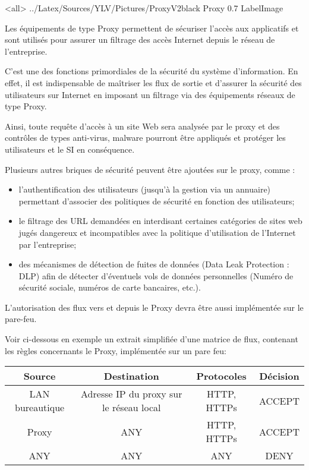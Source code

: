\mode<all>{\picframe
{../Latex/Sources/YLV/Pictures/ProxyV2black}%
{Proxy} %
{0.7} %
{LabelImage} %
}

Les équipements de type Proxy permettent de sécuriser l'accès aux applicatifs et sont utilisés pour assurer un filtrage des accès Internet depuis le réseau de l'entreprise.

C'est une des fonctions primordiales de la sécurité du système d'information.
En effet, il est indispensable de maîtriser les flux de sortie et d'assurer la sécurité des utilisateurs sur Internet en imposant un filtrage via des équipements réseaux de type Proxy. 

Ainsi, toute requête d'accès à un site Web sera analysée par le proxy et des contrôles de types anti-virus, malware pourront être appliqués et protéger les utilisateurs et le SI en conséquence.

Plusieurs autres briques de sécurité peuvent être ajoutées sur le proxy, comme :
\begin{itemize}
    \item l'authentification des utilisateurs (jusqu'à la gestion via un annuaire) permettant d'associer des politiques de sécurité en fonction des utilisateurs;
    \item le filtrage des URL demandées en interdisant certaines catégories de sites web jugés dangereux et incompatibles avec la politique d'utilisation de l'Internet par l'entreprise;
    \item des mécanismes de détection de fuites de données (Data Leak Protection : DLP) afin de détecter d'éventuels vols de données personnelles (Numéro de sécurité sociale, numéros de carte bancaires, etc.).
\end{itemize}

L'autorisation des flux vers et depuis le Proxy devra être aussi implémentée sur le pare-feu.

Voir ci-dessous en exemple un extrait simplifiée d'une matrice de flux, contenant les règles concernants le Proxy, implémentée sur un pare feu:

\begin{center}
\begin{tabular}{||c c c c||} 
 \hline
 Source & Destination & Protocoles & Décision \\ [0.5ex] 
 \hline\hline
 LAN bureautique & Adresse IP du proxy sur le réseau local & HTTP, HTTPs & ACCEPT \\ 
 \hline
 Proxy & ANY & HTTP, HTTPs & ACCEPT \\
 \hline
 ANY & ANY & ANY & DENY \\
 \hline
\end{tabular}
\end{center}

